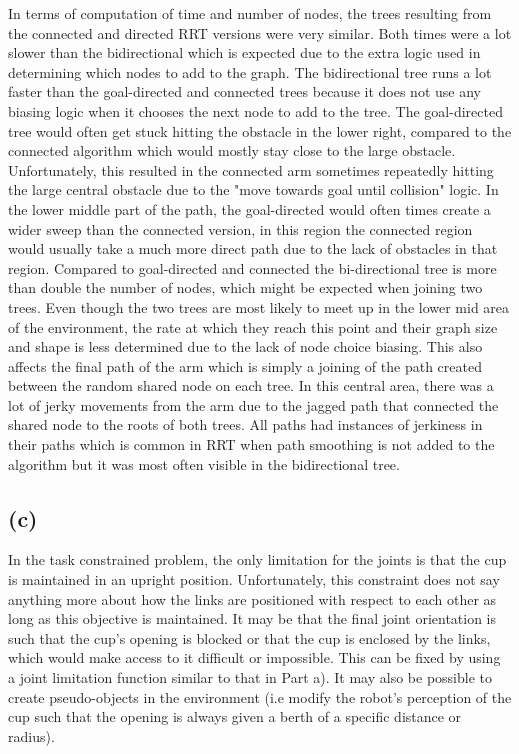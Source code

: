 \documentclass[12pt]{article}
\newcommand{\problemPart}[1]{\subsection*{(#1)}}
\begin{document}
In terms of computation of time and number of nodes, the trees resulting from the connected and directed RRT versions were very similar. Both times were a lot slower than the bidirectional which is expected due to the extra logic used in determining which nodes to add to the graph. The bidirectional tree runs a lot faster than the goal-directed and connected trees because it does not use any biasing logic when it chooses the next node to add to the tree.
The goal-directed tree would often get stuck hitting the obstacle in the lower right, compared to the connected algorithm which would mostly stay close to the large obstacle. Unfortunately, this resulted in the connected arm sometimes repeatedly hitting the large central obstacle due to the "move towards goal until collision" logic. 
In the lower middle part of the path, the goal-directed would often times create a wider sweep than the connected version, in this region the connected region would usually take a much more direct path due to the lack of obstacles in that region.
Compared to goal-directed and connected the bi-directional tree is more than double the number of nodes, which might be expected when joining two trees. Even though the two trees are most likely to meet up in the lower mid area of the environment, the rate at which they reach this point and their graph size and shape is less determined due to the lack of node choice biasing. This also affects the final path of the arm which is simply a joining of the path created between the random shared node on each tree. In this central area, there was a lot of jerky movements from the arm due to the jagged path that connected the shared node to the roots of both trees. All paths had instances of jerkiness in their paths which is common in RRT when path smoothing is not added to the algorithm but it was most often visible in the bidirectional tree.

\problemPart{c}
In the task constrained problem, the only limitation for the joints is that the cup is maintained in an upright position. Unfortunately, this constraint does not say anything more about how the links are positioned with respect to each other as long as this objective is maintained. It may be that the final joint orientation is such that the cup's opening is blocked or that the cup is enclosed by the links, which would make access to it difficult or impossible. This can be fixed by using a joint limitation function similar to that in Part a). It may also be possible to create pseudo-objects in the environment (i.e  modify the robot's perception of the cup such that the opening is always given a berth of a specific distance or radius).
\end{document}

